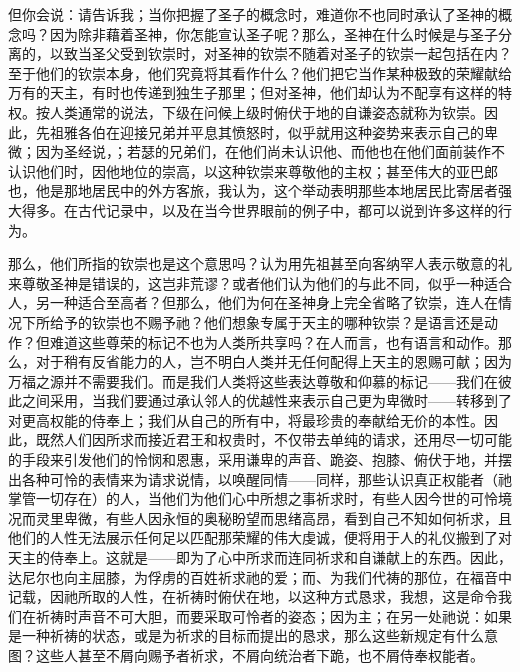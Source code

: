 但你会说：请告诉我；当你把握了圣子的概念时，难道你不也同时承认了圣神的概念吗？因为除非藉着圣神，你怎能宣认圣子呢？那么，圣神在什么时候是与圣子分离的，以致当圣父受到钦崇时，对圣神的钦崇不随着对圣子的钦崇一起包括在内？至于他们的钦崇本身，他们究竟将其看作什么？他们把它当作某种极致的荣耀献给万有的天主，有时也传递到独生子那里；但对圣神，他们却认为不配享有这样的特权。按人类通常的说法，下级在问候上级时俯伏于地的自谦姿态就称为钦崇。因此，先祖雅各伯在迎接兄弟并平息其愤怒时，似乎就用这种姿势来表示自己的卑微；因为圣经说，；若瑟的兄弟们，在他们尚未认识他、而他也在他们面前装作不认识他们时，因他地位的崇高，以这种钦崇来尊敬他的主权；甚至伟大的亚巴郎也，他是那地居民中的外方客旅，我认为，这个举动表明那些本地居民比寄居者强大得多。在古代记录中，以及在当今世界眼前的例子中，都可以说到许多这样的行为。\par

那么，他们所指的钦崇也是这个意思吗？认为用先祖甚至向客纳罕人表示敬意的礼来尊敬圣神是错误的，这岂非荒谬？或者他们认为他们的与此不同，似乎一种适合人，另一种适合至高者？但那么，他们为何在圣神身上完全省略了钦崇，连人在情况下所给予的钦崇也不赐予祂？他们想象专属于天主的哪种钦崇？是语言还是动作？但难道这些尊荣的标记不也为人类所共享吗？在人而言，也有语言和动作。那么，对于稍有反省能力的人，岂不明白人类并无任何配得上天主的恩赐可献；因为万福之源并不需要我们。而是我们人类将这些表达尊敬和仰慕的标记——我们在彼此之间采用，当我们要通过承认邻人的优越性来表示自己更为卑微时——转移到了对更高权能的侍奉上；我们从自己的所有中，将最珍贵的奉献给无价的本性。因此，既然人们因所求而接近君王和权贵时，不仅带去单纯的请求，还用尽一切可能的手段来引发他们的怜悯和恩惠，采用谦卑的声音、跪姿、抱膝、俯伏于地，并摆出各种可怜的表情来为请求说情，以唤醒同情——同样，那些认识真正权能者（祂掌管一切存在）的人，当他们为他们心中所想之事祈求时，有些人因今世的可怜境况而灵里卑微，有些人因永恒的奥秘盼望而思绪高昂，看到自己不知如何祈求，且他们的人性无法展示任何足以匹配那荣耀的伟大虔诚，便将用于人的礼仪搬到了对天主的侍奉上。这就是——即为了心中所求而连同祈求和自谦献上的东西。因此，达尼尔也向主屈膝，为俘虏的百姓祈求祂的爱；而、为我们代祷的那位，在福音中记载，因祂所取的人性，在祈祷时俯伏在地，以这种方式恳求，我想，这是命令我们在祈祷时声音不可大胆，而要采取可怜者的姿态；因为主；在另一处祂说：如果是一种祈祷的状态，或是为祈求的目标而提出的恳求，那么这些新规定有什么意图？这些人甚至不屑向赐予者祈求，不屑向统治者下跪，也不屑侍奉权能者。\par

